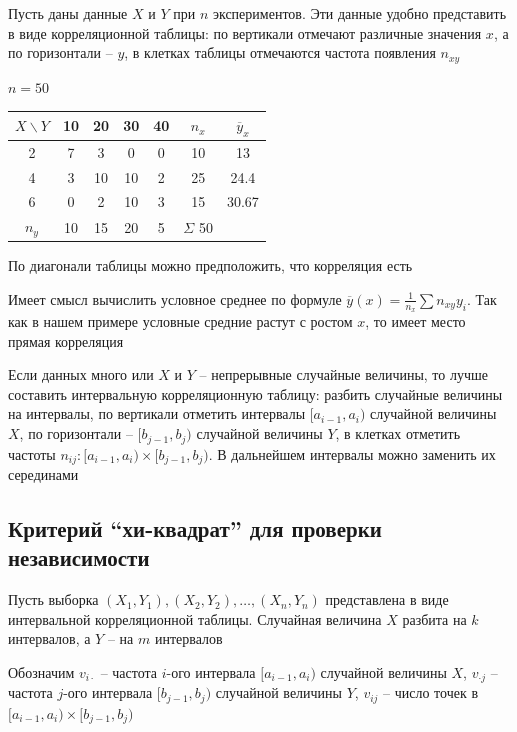 Пусть даны данные $X$ и $Y$ при $n$ экспериментов. Эти данные удобно представить в виде корреляционной таблицы:
по вертикали отмечают различные значения $x$, а по горизонтали -- $y$, в клетках таблицы отмечаются частота появления $n_{xy}$

\Ex $n = 50$

\smallvspace

\begin{tabular}{c|c|c|c|c|c|c}
    $X\backslash Y$ & 10 & 20 & 30 & 40 & $n_x$ & $\overline y_x$ \\
    \hline
    2 & 7 & 3 & 0 & 0 & 10 & 13 \\
    \hline
    4 & 3 & 10 & 10 & 2 & 25 & 24.4 \\
    \hline
    6 & 0 & 2 & 10 & 3 & 15 & 30.67 \\
    \hline
    $n_y$ & 10 & 15 & 20 & 5 & $\Sigma$ 50 & \\
\end{tabular}

\smallvspace

По диагонали таблицы можно предположить, что корреляция есть

Имеет смысл вычислить условное среднее по формуле $\overline y (x) = \frac{1}{n_x} \sum n_{xy} y_i$. Так как в нашем примере
условные средние растут с ростом $x$, то имеет место прямая корреляция

\Nota Если данных много или $X$ и $Y$ -- непрерывные случайные величины, то лучше составить интервальную корреляционную таблицу:
разбить случайные величины на интервалы, по вертикали отметить интервалы $[a_{i - 1}, a_i)$ случайной величины $X$, 
по горизонтали -- $[b_{j - 1}, b_j)$ случайной величины $Y$, в клетках 
отметить частоты $n_{ij} : [a_{i - 1}, a_i) \times [b_{j - 1}, b_j)$. В дальнейшем интервалы можно заменить их серединами

\hypertarget{chi_square_independence_criterion}{}

\subsection{Критерий \enquote{хи-квадрат} для проверки независимости}

Пусть выборка $(X_1, Y_1), (X_2, Y_2), \dots, (X_n, Y_n)$ представлена в виде интервальной корреляционной таблицы. Случайная величина $X$ 
разбита на $k$ интервалов, а $Y$ -- на $m$ интервалов

Обозначим $v_{i\cdot}$ -- частота $i$-ого интервала $[a_{i - 1}, a_i)$ случайной величины $X$, 
$v_{\cdot j}$ -- частота $j$-ого интервала $[b_{j - 1}, b_j)$ случайной величины $Y$, $v_{ij}$ -- число точек в $[a_{i - 1}, a_i) \times [b_{j - 1}, b_j)$


